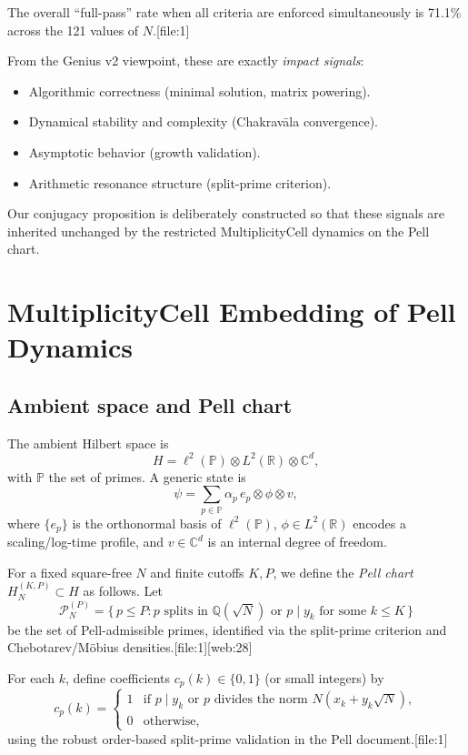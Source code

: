 \documentclass[11pt]{article}
\begin{document}
The overall ``full-pass'' rate when all criteria are enforced
simultaneously is 71.1\% across the 121 values of \(N\).[file:1]

From the Genius v2 viewpoint, these are exactly \emph{impact signals}:

\begin{itemize}
  \item Algorithmic correctness (minimal solution, matrix powering).
  \item Dynamical stability and complexity (Chakrav\=ala convergence).
  \item Asymptotic behavior (growth validation).
  \item Arithmetic resonance structure (split-prime criterion).
\end{itemize}

Our conjugacy proposition is deliberately constructed so that these
signals are inherited unchanged by the restricted MultiplicityCell
dynamics on the Pell chart.

\section{MultiplicityCell Embedding of Pell Dynamics}

\subsection{Ambient space and Pell chart}

The ambient Hilbert space is
\[
H = \ell^2(\mathbb{P}) \otimes L^2(\mathbb{R}) \otimes \mathbb{C}^d,
\]
with \(\mathbb{P}\) the set of primes. A generic state is
\[
\psi = \sum_{p \in \mathbb{P}} \alpha_p \, e_p \otimes \phi \otimes v,
\]
where \(\{e_p\}\) is the orthonormal basis of \(\ell^2(\mathbb{P})\),
\(\phi \in L^2(\mathbb{R})\) encodes a scaling/log-time profile, and
\(v\in\mathbb{C}^d\) is an internal degree of freedom.

For a fixed square-free \(N\) and finite cutoffs \(K,P\), we define the
\emph{Pell chart} \(H_N^{(K,P)} \subset H\) as follows. Let
\[
\mathcal{P}_N^{(P)} = \{\, p \le P : p\text{ splits in } \mathbb{Q}(\sqrt{N})
\text{ or } p\mid y_k \text{ for some } k \le K \,\}
\]
be the set of Pell-admissible primes, identified via the split-prime
criterion and Chebotarev/M\"obius densities.[file:1][web:28]

For each \(k\), define coefficients \(c_p(k)\in\{0,1\}\) (or small
integers) by
\[
c_p(k) =
\begin{cases}
1 & \text{if } p \mid y_k \text{ or } p \text{ divides the norm }
  N(x_k + y_k\sqrt{N}),\\
0 & \text{otherwise},
\end{cases}
\]
using the robust order-based split-prime validation in the Pell
document.[file:1]
\end{document}
